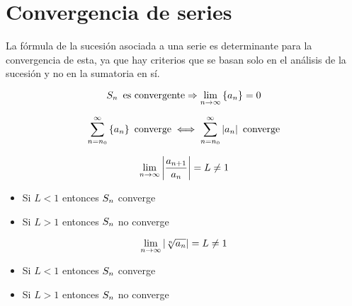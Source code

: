 \section{Convergencia de series}

La fórmula de la sucesión asociada a una serie es determinante para la convergencia de esta, ya que hay criterios que se basan solo en el análisis de la sucesión y no en la sumatoria en sí.

\begin{mdframed}[style=PropertyFrame]
    \begin{prop}
    \end{prop}
    \begin{equation*}
        S_n \enspace \textrm{es convergente} \Rightarrow \lim_{n\to\infty} { \left\{ {a_n} \right\} } = 0
    \end{equation*}
\end{mdframed}

\begin{mdframed}[style=PropertyFrame]
    \begin{prop}
    \end{prop}
    \begin{equation*}
        \sum_{n=n_0}^\infty { \left\{ {a_n} \right\} } \enspace \textrm{converge} \iff \sum_{n=n_0}^\infty {\left| {a_n} \right|} \enspace \textrm{converge}
    \end{equation*}
\end{mdframed}

\begin{mdframed}[style=PropertyFrame]
    \begin{prop}
        \label{prop:DAlembert}
    \end{prop}
    \begin{equation*}
        \lim_{n\to\infty} {\left| {\frac{a_{n+1}}{a_n}} \right|} = L \neq 1
    \end{equation*}
    \begin{itemize}
        \item Si $L<1$ entonces $S_n$ converge
        \item Si $L>1$ entonces $S_n$ no converge
    \end{itemize}
\end{mdframed}

\begin{mdframed}[style=PropertyFrame]
    \begin{prop}
        \label{prop:CauchyCriterion}
    \end{prop}
    \begin{equation*}
        \lim_{n\to\infty} {\left| {\sqrt[n]{a_n}} \right|} = L \neq 1
    \end{equation*}
    \begin{itemize}
        \item Si $L<1$ entonces $S_n$ converge
        \item Si $L>1$ entonces $S_n$ no converge
    \end{itemize}
\end{mdframed}


